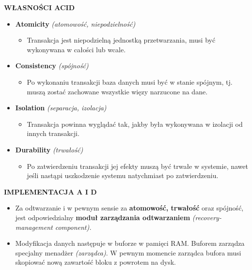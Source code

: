 \documentclass[a5paper,6pt]{article}
\begin{document}
    \textbf{WŁASNOŚCI ACID}
    \begin{itemize}
        \item \textbf{Atomicity} \textit{(atomowość, niepodzielność)}
        \begin{itemize}
            \item Transakcja jest niepodzielną jednostką przetwarzania, musi
                  być wykonywana w całości lub wcale.
        \end{itemize}

        \item \textbf{Consistency} \textit{(spójność)}
        \begin{itemize}
            \item Po wykonaniu transakcji baza danych musi być w stanie spójnym,
                  tj. muszą zostać zachowane wszystkie więzy narzucone na dane.
        \end{itemize}

        \item \textbf{Isolation} \textit{(separacja, izolacja)}
        \begin{itemize}
            \item Transakcja powinna wyglądać tak, jakby była wykonywana w
                  izolacji od innych transakcji.
        \end{itemize}

        \item \textbf{Durability} \textit{(trwałość)}
        \begin{itemize}
            \item Po zatwierdzeniu transakcji jej efekty muszą być trwałe w
                  systemie, nawet jeśli nastąpi uszkodzenie systemu natychmiast
                  po zatwierdzeniu.
        \end{itemize}

    \end{itemize}

    \textbf{IMPLEMENTACJA A I D}
    \begin{itemize}
        \item Za odtwarzanie i w pewnym sensie za \textbf{atomowość, trwałość}
              oraz spójność, jest odpowiedzialny \textbf{moduł zarządzania
              odtwarzaniem} \textit{(recovery-management component).}

        \item Modyfikacja danych następuje w buforze w pamięci RAM. Buforem
              zarządza specjalny menadżer \textit{(zarządca)}.
              W pewnym momencie zarządca bufora musi skopiować nową zawartość
              bloku z powrotem na dysk.
    \end{itemize}
\end{document}
